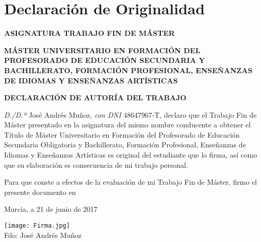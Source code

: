 \chapter*{Declaración de Originalidad}

	\begin{center}
		\textbf{ASIGNATURA TRABAJO FIN DE MÁSTER}
	\end{center}
	\begin{center}
		\textbf{MÁSTER UNIVERSITARIO EN FORMACIÓN DEL PROFESORADO DE EDUCACIÓN SECUNDARIA Y BACHILLERATO, FORMACIÓN PROFESIONAL, ENSEÑANZAS DE IDIOMAS Y ENSEÑANZAS ARTÍSTICAS}\\
	\end{center}
	\begin{center}
		\textbf{DECLARACIÓN DE AUTORÍA DEL TRABAJO}
	\end{center}
	
	\textit{D./D.ª} José Andrés Muñoz, \textit{con DNI} 48647967-T, declaro que el Trabajo Fin de Máster presentado en la asignatura del mismo nombre conducente a obtener el Título de Máster Universitario en Formación del Profesorado de Educación Secundaria Obligatoria y Bachillerato, Formación Profesional, Enseñanzas de Idiomas y Enseñanzas Artísticas es original del estudiante que lo firma, así como que su elaboración es consecuencia de mi trabajo personal.
	
	Para que conste a efectos de la evaluación de mi Trabajo Fin de Máster, firmo el presente documento en
	
	\begin{center}
		Murcia, a 21 de junio de 2017
	\end{center}
	
	
	\begin{center}
		\texttt{[image: Firma.jpg]}\\
		Fdo: José Andrés Muñoz
	\end{center}
	
	
	
	

%	
%	
%	
%	
%	
%	
%	
	